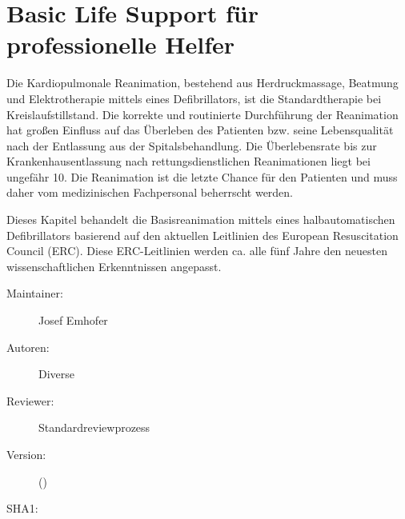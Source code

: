 % 
% 
\def\ChapterCode{BLS}
\chapter
[\CO{[BLS]} Basic Life Support]
{Basic Life Support für professionelle Helfer}
\label{chp:AED}\label{chp:BLS}
\label{topic:atemstillstand-aed}
\label{topic:kreislaufstillstand-aed}
\label{topic:atemstillstand-bls}
\label{topic:kreislaufstillstand-bls}
\label{topic:pediatric-life-support}

\ChapterIntro
{Die Kardiopulmonale Reanimation, bestehend aus
Herdruckmassage, Beatmung und Elektrotherapie mittels eines
Defibrillators, ist die Standardtherapie bei
Kreislaufstillstand. Die korrekte
und routinierte Durchführung der Reanimation hat großen
Einfluss auf das Überleben des Patienten bzw. seine
Lebensqualität nach der Entlassung aus der
Spitalsbehandlung. Die Überlebensrate bis zur
Krankenhausentlassung nach rettungsdienstlichen
Reanimationen liegt bei ungefähr 10\PC*
\cite{Erc2010Sek01De}. Die Reanimation ist die letzte
Chance für den Patienten und muss daher vom medizinischen
Fachpersonal beherrscht werden.

Dieses Kapitel behandelt die Basisreanimation mittels
eines halbautomatischen Defibrillators basierend auf den
aktuellen Leitlinien des European Resuscitation Council
(ERC). Diese ERC-Leitlinien werden ca. alle fünf Jahre den
neuesten wissenschaftlichen Erkenntnissen angepasst.}{%
\begin{description}
  \item[Maintainer:] Josef Emhofer
  \item[Autoren:] Diverse
  \item[Reviewer:] Standardreviewprozess
  \item[Version:] {\VarDocVersionTypeName} ({\VarDocVersionTypeDescription})
  \item[SHA1:] {\DocGitCommit}
\end{description}

{\TxTeilkapitelAASS}
}

